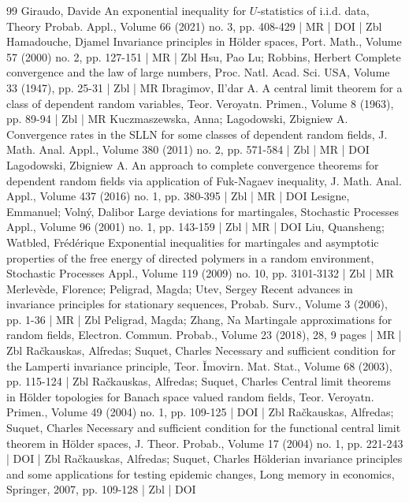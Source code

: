 \begin{thebibliography}{99}
 Giraudo, Davide An exponential inequality for $U$-statistics of i.i.d. data, Theory Probab. Appl., Volume 66 (2021) no. 3, pp. 408-429 | MR | DOI | Zbl
 Hamadouche, Djamel Invariance principles in Hölder spaces, Port. Math., Volume 57 (2000) no. 2, pp. 127-151 | MR | Zbl
 Hsu, Pao Lu; Robbins, Herbert Complete convergence and the law of large numbers, Proc. Natl. Acad. Sci. USA, Volume 33 (1947), pp. 25-31 | Zbl | MR
 Ibragimov, Il’dar A. A central limit theorem for a class of dependent random variables, Teor. Veroyatn. Primen., Volume 8 (1963), pp. 89-94 | Zbl | MR
 Kuczmaszewska, Anna; Lagodowski, Zbigniew A. Convergence rates in the SLLN for some classes of dependent random fields, J. Math. Anal. Appl., Volume 380 (2011) no. 2, pp. 571-584 | Zbl | MR | DOI
 Lagodowski, Zbigniew A. An approach to complete convergence theorems for dependent random fields via application of Fuk-Nagaev inequality, J. Math. Anal. Appl., Volume 437 (2016) no. 1, pp. 380-395 | Zbl | MR | DOI
 Lesigne, Emmanuel; Volný, Dalibor Large deviations for martingales, Stochastic Processes Appl., Volume 96 (2001) no. 1, pp. 143-159 | Zbl | MR | DOI
 Liu, Quansheng; Watbled, Frédérique Exponential inequalities for martingales and asymptotic properties of the free energy of directed polymers in a random environment, Stochastic Processes Appl., Volume 119 (2009) no. 10, pp. 3101-3132 | Zbl | MR
 Merlevède, Florence; Peligrad, Magda; Utev, Sergey Recent advances in invariance principles for stationary sequences, Probab. Surv., Volume 3 (2006), pp. 1-36 | MR | Zbl
 Peligrad, Magda; Zhang, Na Martingale approximations for random fields, Electron. Commun. Probab., Volume 23 (2018), 28, 9 pages | MR | Zbl
 Račkauskas, Alfredas; Suquet, Charles Necessary and sufficient condition for the Lamperti invariance principle, Teor. Ĭmovirn. Mat. Stat., Volume 68 (2003), pp. 115-124 | Zbl
 Račkauskas, Alfredas; Suquet, Charles Central limit theorems in Hölder topologies for Banach space valued random fields, Teor. Veroyatn. Primen., Volume 49 (2004) no. 1, pp. 109-125 | DOI | Zbl
 Račkauskas, Alfredas; Suquet, Charles Necessary and sufficient condition for the functional central limit theorem in Hölder spaces, J. Theor. Probab., Volume 17 (2004) no. 1, pp. 221-243 | DOI | Zbl
 Račkauskas, Alfredas; Suquet, Charles Hölderian invariance principles and some applications for testing epidemic changes, Long memory in economics, Springer, 2007, pp. 109-128 | Zbl | DOI

\end{thebibliography}
